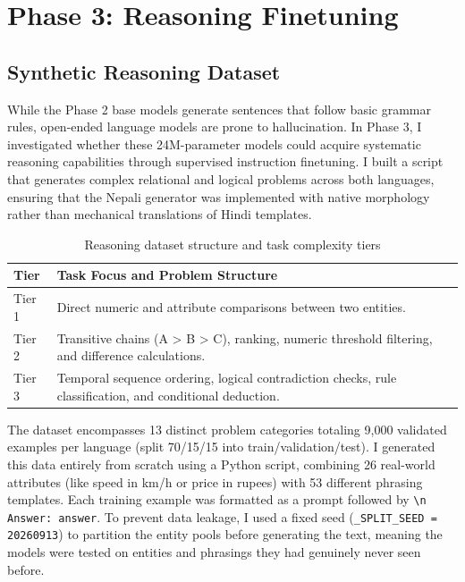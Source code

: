 \documentclass[11pt,a4paper]{article}
\begin{document}
\clearpage
\section{Phase 3: Reasoning Finetuning}

\subsection{Synthetic Reasoning Dataset}

While the Phase 2 base models generate sentences that follow basic grammar rules, open-ended language models are prone to hallucination. In Phase 3, I investigated whether these 24M-parameter models could acquire systematic reasoning capabilities through supervised instruction finetuning. I built a script that generates complex relational and logical problems across both languages, ensuring that the Nepali generator was implemented with native morphology rather than mechanical translations of Hindi templates.

\begin{table}[htbp]
\centering
\caption{Reasoning dataset structure and task complexity tiers}
\begin{tabular}{lp{12.5cm}}
\toprule
\textbf{Tier} & \textbf{Task Focus and Problem Structure} \\
\midrule
Tier 1 & Direct numeric and attribute comparisons between two entities. \\
Tier 2 & Transitive chains (A > B > C), ranking, numeric threshold filtering, and difference calculations. \\
Tier 3 & Temporal sequence ordering, logical contradiction checks, rule classification, and conditional deduction. \\
\bottomrule
\end{tabular}
\end{table}

The dataset encompasses 13 distinct problem categories totaling 9,000 validated examples per language (split 70/15/15 into train/validation/test). I generated this data entirely from scratch using a Python script, combining 26 real-world attributes (like speed in km/h or price in rupees) with 53 different phrasing templates. Each training example was formatted as a prompt followed by \texttt{\textbackslash n Answer: answer}. To prevent data leakage, I used a fixed seed (\texttt{\_SPLIT\_SEED = 20260913}) to partition the entity pools before generating the text, meaning the models were tested on entities and phrasings they had genuinely never seen before.
\end{document}
